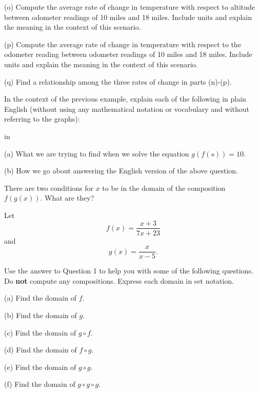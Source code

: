 \documentclass{ximera}
\newcommand{\pskip}{\vskip 0.1 in}
\begin{document}
\begin{example}
(o) Compute the average rate of change in temperature with respect to altitude between odometer readings of 10 miles and 18 miles. Include units and explain the meaning in the context of this scenario.

(p) Compute the average rate of change in temperature with respect to the odometer reading between odometer readings of 10 miles and 18 miles. Include units and explain the meaning in the context of this scenario.

(q) Find a relationship among the three rates of change in parts (n)-(p).


\begin{exploration}\label{Exp3:Comp}

 
\begin{onlineOnly}
    \begin{center}
\end{center}
\end{onlineOnly}
\end{exploration}

\end{example}



\begin{example} \label{Ex4:Comp}
In the context of the previous example, explain each of the following in plain English (without using any mathematical notation or vocabulary and without referring to the graphs):

\pskip

(a) What we are trying to find when we solve the equation $g(f(s)) = 10$.

(b) How we go about answering the English version of the above question.

\end{example}


\begin{question}   \label{Q1:Comp}
There are two conditions for $x$ to be in the domain of the composition $f(g(x))$. What are they?
\end{question}

\begin{example} \label{Ex1:Comp}
Let 
\[
     f(x) = \frac{x+3}{7x+23}
\]
and
\[
    g(x) = \frac{x}{x-5} .
\]

Use the answer to Question 1 to help you with some of the following questions. Do {\bf not} compute any compositions. Express each domain in set notation.
 
(a) Find the domain of $f$.

(b) Find the domain of $g$.

(c) Find the domain of $g\circ f$.

(d) Find the domain of $f\circ g$.

(e) Find the domain of $g\circ g$.

(f) Find the domain of $g\circ g\circ g$.

\end{example}
\end{document}

